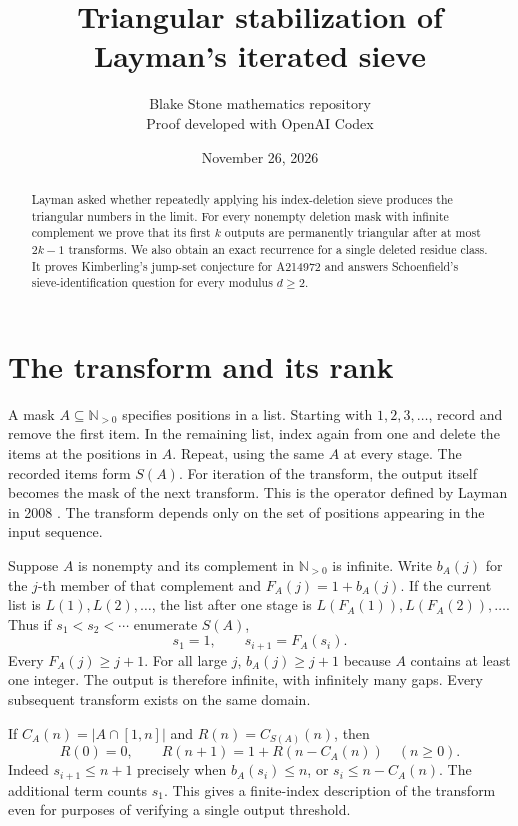 \documentclass[11pt]{article}
\title{Triangular stabilization of Layman's iterated sieve}
\author{Blake Stone mathematics repository\\[-2pt]\small Proof developed with OpenAI Codex}
\date{November 26, 2026}
\newcommand{\NN}{\mathbb N_{>0}}
\begin{document}
\maketitle
\begin{abstract}
Layman asked whether repeatedly applying his index-deletion sieve produces
the triangular numbers in the limit. For every nonempty deletion mask with
infinite complement we prove that its first $k$ outputs are permanently
triangular after at most $2k-1$ transforms. We also obtain an exact recurrence
for a single deleted residue class. It proves Kimberling's jump-set conjecture
for A214972 and answers Schoenfield's sieve-identification question for every
modulus $d\ge2$.
\end{abstract}

\section{The transform and its rank}
A mask $A\subseteq\NN$ specifies positions in a list. Starting with
$1,2,3,\ldots$, record and remove the first item. In the remaining list,
index again from one and delete the items at the positions in $A$.
Repeat, using the same $A$ at every stage. The recorded items form
$S(A)$. For iteration of the transform, the output itself becomes the mask
of the next transform. This is the operator defined by Layman in 2008
\cite{layman}. The transform depends only on the set of positions
appearing in the input sequence.

Suppose $A$ is nonempty and its complement in $\NN$ is infinite. Write
$b_A(j)$ for the $j$-th member of that complement and
$F_A(j)=1+b_A(j)$. If the current list is $L(1),L(2),\ldots$,
the list after one stage is $L(F_A(1)),L(F_A(2)),\ldots$. Thus if
$s_1<s_2<\cdots$ enumerate $S(A)$,
\begin{equation}
 s_1=1,\qquad s_{i+1}=F_A(s_i).
 \label{eq:orbit}
\end{equation}
Every $F_A(j)\ge j+1$. For all large $j$, $b_A(j)\ge j+1$ because $A$
contains at least one integer. The output is therefore infinite, with
infinitely many gaps. Every subsequent transform exists on the same domain.

If $C_A(n)=|A\cap[1,n]|$ and $R(n)=C_{S(A)}(n)$, then
\begin{equation}
 R(0)=0,\qquad R(n+1)=1+R(n-C_A(n))\quad(n\ge0).
 \label{eq:rank}
\end{equation}
Indeed $s_{i+1}\le n+1$ precisely when $b_A(s_i)\le n$, or
$s_i\le n-C_A(n)$. The additional term counts $s_1$.
This gives a finite-index description of the transform even for purposes
of verifying a single output threshold.
\end{document}
